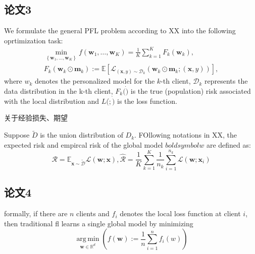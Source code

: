 \subsection{论文3}
We formulate the general PFL problem according to XX into the following oprtimization task:
\begin{align*}
    \min_{\left\{\boldsymbol{w}_1,\ldots,\boldsymbol{w}_K\right\}}f\left(\boldsymbol{w}_1,\ldots,\boldsymbol{w}_K\right)=\frac1K\sum_{k=1}^K F_k\left(\boldsymbol{w}_k\right),\\
    F_k\left(\boldsymbol{w}_k\odot\boldsymbol{m}_k\right):=\mathbb{E}\left[\mathcal{L}_{\left(\boldsymbol{x},y\right)\boldsymbol{\sim}\mathcal{D}_k}\left(\boldsymbol{w}_k\odot\boldsymbol{m}_k;\left(\boldsymbol{x},y\right)\right)\right],
\end{align*}
where $w_k$ denotes the personalized model for the $k$-th client, $\mathcal{D}_k$ represents the data distribution in the k-th client, $F_k(\dot)$ is the true (population) risk associated with the local distribution and $L(\dot;\dot)$ is the loss function.

关于经验损失、期望

Suppose $\tilde{D}$ is the union distribution of $D_k$. FOllowing notations in XX, the expected risk and empircal risk of the global model $boldsymbol{w}$ are defined as:
\begin{equation*}
    \mathcal{R}=\mathbb{E}_{\boldsymbol{x}\sim\tilde{\mathcal{D}}}\mathcal{L}(\boldsymbol{w};\boldsymbol{x}),\hat{\mathcal{R}}=\frac1K\sum_{k=1}^K\frac1{n_k}\sum_{i=1}^{n_k}\mathcal{L}(\boldsymbol{w};\boldsymbol{x}_i)
\end{equation*}

\subsection{论文4}
formally, if there are $n$ clients and $f_i$ denotes the local loss function at client $i$, then traditional \acs{fl} learns a single global model by minimizing
\begin{equation*}
    \operatorname*{\arg\,\min}_{\boldsymbol{w}\in{\mathbb{R}^d}}\left(f(\boldsymbol{w}):=\frac1n\sum_{i=1}^n f_i(w)\right)
\end{equation*}

